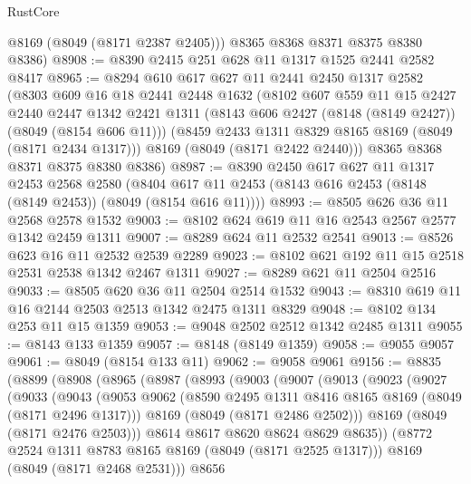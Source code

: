 \begin{lexlean}{RustCore}
\begin{coremodule}
        @8169
        (@8049 (@8171 @2387 @2405)))
      @8365
      @8368
      @8371
      @8375
      @8380
      @8386)
@8908 := @8390 @2415 @251 @628 @11 @1317 @1525 @2441 @2582 @8417
@8965 := @8294
    @610
    @617
    @627
    @11
    @2441
    @2450
    @1317
    @2582
    (@8303
      @609
      @16
      @18
      @2441
      @2448
      @1632
      (@8102
        @607
        @559
        @11
        @15
        @2427
        @2440
        @2447
        @1342
        @2421
        @1311
        (@8143 @606 @2427 (@8148 (@8149 @2427)) (@8049 (@8154 @606 @11)))
        (@8459 @2433 @1311 @8329 @8165 @8169 (@8049 (@8171 @2434 @1317)))
        @8169
        (@8049 (@8171 @2422 @2440)))
      @8365
      @8368
      @8371
      @8375
      @8380
      @8386)
@8987 := @8390
    @2450
    @617
    @627
    @11
    @1317
    @2453
    @2568
    @2580
    (@8404 @617 @11 @2453 (@8143 @616 @2453 (@8148 (@8149 @2453)) (@8049 (@8154 @616 @11))))
@8993 := @8505 @626 @36 @11 @2568 @2578 @1532
@9003 := @8102 @624 @619 @11 @16 @2543 @2567 @2577 @1342 @2459 @1311
@9007 := @8289 @624 @11 @2532 @2541
@9013 := @8526 @623 @16 @11 @2532 @2539 @2289
@9023 := @8102 @621 @192 @11 @15 @2518 @2531 @2538 @1342 @2467 @1311
@9027 := @8289 @621 @11 @2504 @2516
@9033 := @8505 @620 @36 @11 @2504 @2514 @1532
@9043 := @8310 @619 @11 @16 @2144 @2503 @2513 @1342 @2475 @1311 @8329
@9048 := @8102 @134 @253 @11 @15 @1359
@9053 := @9048 @2502 @2512 @1342 @2485 @1311
@9055 := @8143 @133 @1359
@9057 := @8148 (@8149 @1359)
@9058 := @9055 @9057
@9061 := @8049 (@8154 @133 @11)
@9062 := @9058 @9061
@9156 := @8835
    (@8899
      (@8908
        (@8965
          (@8987
            (@8993
              (@9003
                (@9007
                  (@9013
                    (@9023
                      (@9027
                        (@9033
                          (@9043
                            (@9053
                              @9062
                              (@8590 @2495 @1311 @8416 @8165 @8169 (@8049 (@8171 @2496 @1317)))
                              @8169
                              (@8049 (@8171 @2486 @2502)))
                            @8169
                            (@8049 (@8171 @2476 @2503)))
                          @8614
                          @8617
                          @8620
                          @8624
                          @8629
                          @8635))
                      (@8772 @2524 @1311 @8783 @8165 @8169 (@8049 (@8171 @2525 @1317)))
                      @8169
                      (@8049 (@8171 @2468 @2531)))
                    @8656

\end{coremodule}
\end{lexlean}
